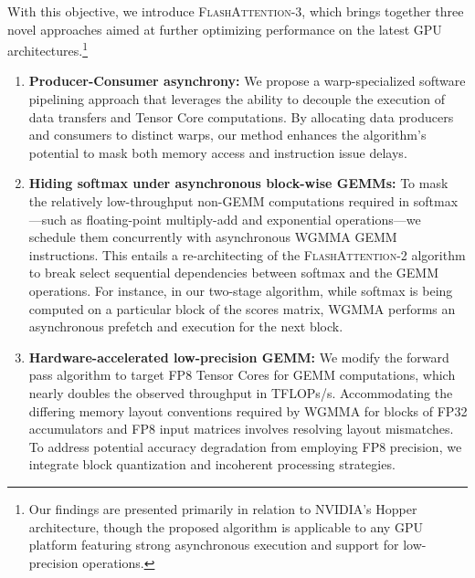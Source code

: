With this objective, we introduce \textsc{FlashAttention-3}, which brings together three novel approaches aimed at further optimizing performance on the latest GPU architectures.\footnote{Our findings are presented primarily in relation to NVIDIA's Hopper architecture, though the proposed algorithm is applicable to any GPU platform featuring strong asynchronous execution and support for low-precision operations.}

\begin{enumerate}

\item \textbf{Producer-Consumer asynchrony:} We propose a warp-specialized software pipelining approach that leverages the ability to decouple the execution of data transfers and Tensor Core computations. By allocating data producers and consumers to distinct warps, our method enhances the algorithm's potential to mask both memory access and instruction issue delays.
\item \textbf{Hiding softmax under asynchronous block-wise GEMMs:} To mask the relatively low-throughput non-GEMM computations required in softmax—such as floating-point multiply-add and exponential operations—we schedule them concurrently with asynchronous WGMMA GEMM instructions. This entails a re-architecting of the \textsc{FlashAttention-2} algorithm to break select sequential dependencies between softmax and the GEMM operations. For instance, in our two-stage algorithm, while softmax is being computed on a particular block of the scores matrix, WGMMA performs an asynchronous prefetch and execution for the next block.
\item \textbf{Hardware-accelerated low-precision GEMM:} We modify the forward pass algorithm to target FP8 Tensor Cores for GEMM computations, which nearly doubles the observed throughput in TFLOPs/s. Accommodating the differing memory layout conventions required by WGMMA for blocks of FP32 accumulators and FP8 input matrices involves resolving layout mismatches. To address potential accuracy degradation from employing FP8 precision, we integrate block quantization and incoherent processing strategies.
\end{enumerate}

